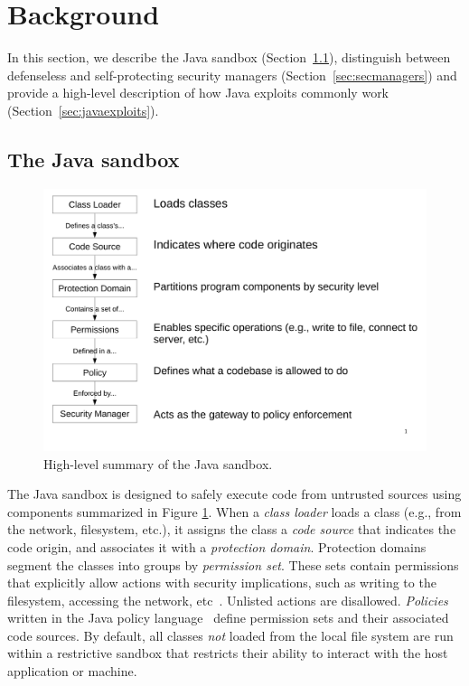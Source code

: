 \documentclass{sig-alternate-05-2015}
\begin{document}
\section{Background}\label{sec:Background}

In this section, we describe the Java sandbox
(Section~\ref{sec:sandbox}), distinguish between defenseless and self-protecting
security managers (Section~\ref{sec:secmanagers}) and provide a high-level
description of how Java exploits commonly work
(Section~\ref{sec:javaexploits}). 

\subsection{The Java sandbox}
\label{sec:sandbox}

\begin{figure}
\includegraphics[width=\columnwidth]{sandbox_overview}
\caption{High-level summary of the Java 
\label{fig:Sandbox-high-level-summary}
sandbox.}
\end{figure}

The Java sandbox is designed to safely execute code from untrusted
sources using components summarized in Figure
\ref{fig:Sandbox-high-level-summary}. 
When a \textit{class loader} loads a class (e.g., from
the network, filesystem, etc.), it assigns the class a \textit{code source} that
indicates the code origin, and associates it with a \textit{protection
  domain}. Protection domains segment the classes into groups by
\textit{permission set}. These sets
contain permissions that explicitly allow actions with security
implications, such as writing to the filesystem, accessing the network, etc~\cite{_permissions_2014}.  Unlisted actions are disallowed.
\emph{Policies} written in the Java policy
language~\cite{_java_policy_language} define permission sets and their associated code
sources. 
By default, all classes \emph{not} loaded from the local file system are run
within a restrictive sandbox that restricts their ability to
interact with the host application or machine. 
\end{document}
